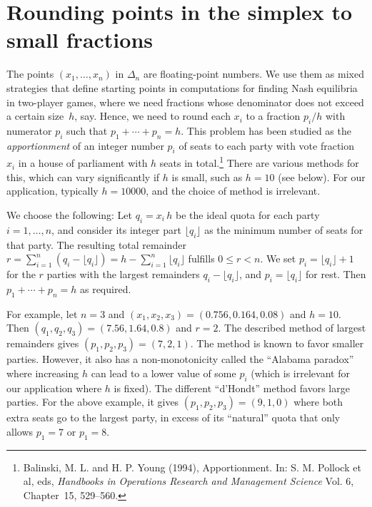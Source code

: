 \documentclass[a4paper,12pt]{article}  %
\theoremstyle{definition}
\newcommand{\0}{{\mathbf0}}
\newcommand{\1}{{\mathbf1}}
\begin{document}
\section{Rounding points in the simplex to small fractions}

The points $(x_1,\ldots,x_n)$ in $\Delta_n$ are
floating-point numbers.
We use them as mixed strategies that define starting points in
computations for finding Nash equilibria in two-player
games, where we need fractions whose denominator does
not exceed a certain size~$h$, say.
Hence, we need to round each $x_i$ to a fraction $p_i/h$
with numerator $p_i$ such that $p_1+\cdots+p_n=h$.
This problem has been studied as the \textit{apportionment}
of an integer number $p_i$ of seats to each party with vote
fraction~$x_i$ in a house of parliament with $h$ seats
in total.\footnote{Balinski,
M. L. and H. P. Young (1994), Apportionment. In: S. M. Pollock et al, eds,
\textit{Handbooks in Operations Research and Management
Science} Vol. 6, Chapter~15, 529--560.}
There are various methods for this, which can vary
significantly if $h$ is small, such as $h=10$ (see below).
For our application, typically $h=10000$, and the choice of
method is irrelevant.

We choose the following: Let $q_i= x_i\,h$ be
the ideal quota for each party $i=1,\ldots,n$,
and consider its integer part $\lfloor q_i\rfloor$
as the minimum number of seats for that party.
The resulting total remainder
$r=\sum_{i=1}^n (q_i-\lfloor q_i\rfloor)=
h-\sum_{i=1}^n \lfloor q_i\rfloor$ fulfills $0\le r<n$.
We set $p_i=\lfloor q_i\rfloor+1$ for the $r$ parties with
the largest remainders
$q_i-\lfloor q_i\rfloor$, 
and $p_i=\lfloor q_i\rfloor$ for rest.
Then $p_1+\cdots+p_n=h$ as required.

For example, let $n=3$ and $(x_1,x_2,x_3)=(0.756,0.164,0.08)$
and $h=10$. Then $(q_1,q_2,q_3)=(7.56,1.64,0.8)$ and $r=2$.
The described method of largest remainders gives
$(p_1,p_2,p_3)=(7,2,1)$.
The method is known to favor smaller parties.
However, it also has a non-monotonicity called the ``Alabama
paradox'' where increasing $h$ can lead to a lower value of
some $p_i$ (which is irrelevant for our application where
$h$ is fixed).
The different ``d'Hondt'' method favors large parties.
For the above example, it gives $(p_1,p_2,p_3)=(9,1,0)$ where both
extra seats go to the largest party, in excess of its
``natural'' quota that only allows $p_1=7$ or $p_1=8$.

% 
%  
\end{document}
